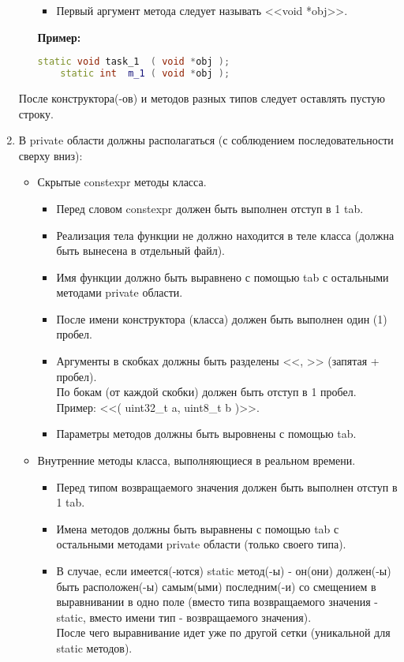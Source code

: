 \begin{enumerate}
\begin{itemize}
\begin{itemize}
			\item Первый аргумент метода следует называть <<void *obj>>.
		\end{itemize}
		\textbf{Пример:}
		\begin{lstlisting}[language=C++, frame=tlBR, basicstyle=\fontsize{8}{8}\ttfamily]
	static void	task_1	( void *obj );
	static int	m_1	( void *obj );
		\end{lstlisting}
	\end{itemize}
	После конструктора(-ов) и методов разных типов следует оставлять пустую строку. 
	\item В private области должны располагаться (с соблюдением последовательности сверху вниз):
	\begin{itemize}
	\item Скрытые constexpr методы класса.
	\begin{itemize}
		\item Перед словом constexpr должен быть выполнен отступ в 1 tab.
		\item Реализация тела функции не должно находится в теле класса (должна быть вынесена в отдельный файл).
		\item Имя функции должно быть выравнено с помощью tab с остальными методами private области.
		\item После имени конструктора (класса) должен быть выполнен один (1) пробел. 
		\item Аргументы в скобках должны быть разделены <<, >> (запятая + пробел).\\По бокам (от каждой скобки) должен быть отступ в 1 пробел.\\Пример: <<( uint32\_t a, uint8\_t b )>>.
		\item Параметры методов должны быть выровнены с помощью tab.
	\end{itemize}
	\item Внутренние методы класса, выполняющиеся в реальном времени.
	\begin{itemize}
		\item Перед типом возвращаемого значения должен быть выполнен отступ в 1 tab.
		\item Имена методов должны быть выравнены с помощью tab с остальными методами private области (только своего типа).
		\item В случае, если имеется(-ются) static метод(-ы) - он(они) должен(-ы) быть расположен(-ы) самым(ыми) последним(-и) со смещением в выравнивании в одно поле (вместо типа возвращаемого значения - static, вместо имени тип - возвращаемого значения).\\После чего выравнивание идет уже по другой сетки (уникальной для static методов).

\end{itemize}
\end{itemize}
\end{enumerate}
